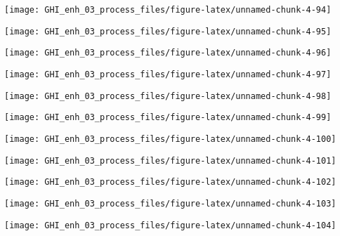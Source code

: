 \documentclass[
  10pt,
  a4paper,oneside]{article}
\begin{document}
\begin{center}\texttt{[image: GHI\_enh\_03\_process\_files/figure-latex/unnamed-chunk-4-94]} \end{center}

\begin{center}\texttt{[image: GHI\_enh\_03\_process\_files/figure-latex/unnamed-chunk-4-95]} \end{center}

\begin{center}\texttt{[image: GHI\_enh\_03\_process\_files/figure-latex/unnamed-chunk-4-96]} \end{center}

\begin{center}\texttt{[image: GHI\_enh\_03\_process\_files/figure-latex/unnamed-chunk-4-97]} \end{center}

\begin{center}\texttt{[image: GHI\_enh\_03\_process\_files/figure-latex/unnamed-chunk-4-98]} \end{center}

\begin{center}\texttt{[image: GHI\_enh\_03\_process\_files/figure-latex/unnamed-chunk-4-99]} \end{center}

\begin{center}\texttt{[image: GHI\_enh\_03\_process\_files/figure-latex/unnamed-chunk-4-100]} \end{center}

\begin{center}\texttt{[image: GHI\_enh\_03\_process\_files/figure-latex/unnamed-chunk-4-101]} \end{center}

\begin{center}\texttt{[image: GHI\_enh\_03\_process\_files/figure-latex/unnamed-chunk-4-102]} \end{center}

\begin{center}\texttt{[image: GHI\_enh\_03\_process\_files/figure-latex/unnamed-chunk-4-103]} \end{center}

\begin{center}\texttt{[image: GHI\_enh\_03\_process\_files/figure-latex/unnamed-chunk-4-104]} \end{center}
\end{document}
